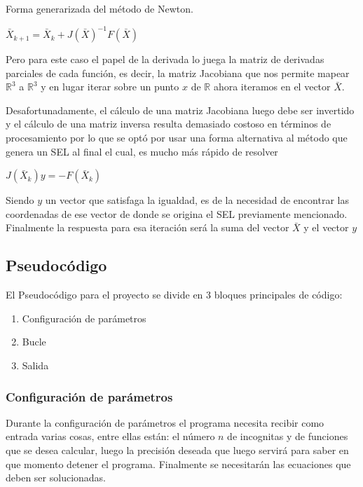 ﻿\documentclass[11pt]{article}
\begin{document}
Forma generarizada del método de Newton.
 
\begin{center}
$\bar{X}_{k+1} = \bar{X}_{k} + {J(\bar{X})}^{-1}F(\bar{X})  \label{eq:2}$
\end{center}

Pero para este caso el papel de la derivada lo juega la matriz de derivadas parciales de cada función, es decir, la matriz Jacobiana que nos permite mapear  $\mathbb{R}^3$ a $\mathbb{R}^3$ y en lugar iterar sobre un punto $x$ de $\mathbb{R}$  ahora iteramos en el vector $\bar{X}$. 

Desafortunadamente, el cálculo de una matriz Jacobiana luego debe ser invertido y el cálculo de una matriz inversa resulta demasiado costoso en términos de procesamiento por lo que se optó por usar una forma alternativa al método que genera un SEL al final el cual, es mucho más rápido de resolver\\

\begin{center}
$J(\bar{X}_{k})y = -F(\bar{X}_{k}) $
\end{center}

Siendo $y$ un vector que satisfaga la igualdad, es de la necesidad de encontrar las coordenadas de ese vector de donde se origina el SEL previamente mencionado. Finalmente la respuesta para esa iteración será la suma del vector $\bar{X}$ y el vector $y$


\subsection{Pseudocódigo}
El Pseudocódigo para el proyecto se divide en 3 bloques principales de código:
\begin{enumerate}
  \item Configuración de parámetros
  \item Bucle
  \item Salida
\end{enumerate}

\subsubsection{Configuración de parámetros}
Durante la configuración de parámetros el programa necesita recibir como entrada varias cosas, entre ellas están: el número  $n$ de incognitas y de funciones que se desea calcular, luego la precisión deseada que luego servirá para saber en que momento detener el programa. Finalmente se necesitarán las ecuaciones que deben ser solucionadas.
\end{document}

